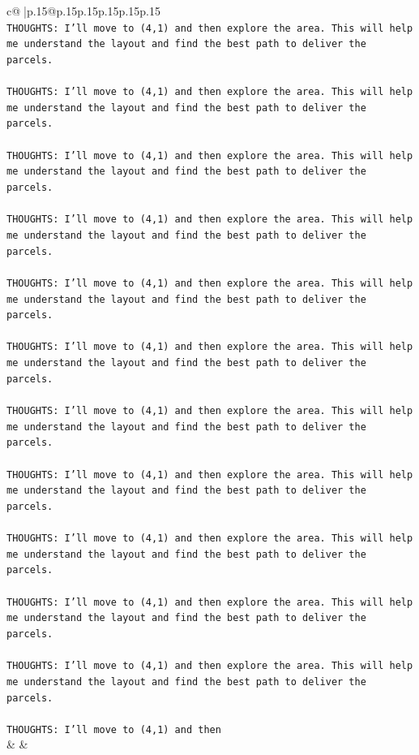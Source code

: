 \documentclass{article}
\begin{document}
{\begin{supertabular}{c@{$\;$}|p{.15\linewidth}@{}p{.15\linewidth}p{.15\linewidth}p{.15\linewidth}p{.15\linewidth}p{.15\linewidth}}
{{{\\ 
\texttt{THOUGHTS: I'll move to (4,1) and then explore the area. This will help me understand the layout and find the best path to deliver the parcels.} \\
\\ 
\texttt{THOUGHTS: I'll move to (4,1) and then explore the area. This will help me understand the layout and find the best path to deliver the parcels.} \\
\\ 
\texttt{THOUGHTS: I'll move to (4,1) and then explore the area. This will help me understand the layout and find the best path to deliver the parcels.} \\
\\ 
\texttt{THOUGHTS: I'll move to (4,1) and then explore the area. This will help me understand the layout and find the best path to deliver the parcels.} \\
\\ 
\texttt{THOUGHTS: I'll move to (4,1) and then explore the area. This will help me understand the layout and find the best path to deliver the parcels.} \\
\\ 
\texttt{THOUGHTS: I'll move to (4,1) and then explore the area. This will help me understand the layout and find the best path to deliver the parcels.} \\
\\ 
\texttt{THOUGHTS: I'll move to (4,1) and then explore the area. This will help me understand the layout and find the best path to deliver the parcels.} \\
\\ 
\texttt{THOUGHTS: I'll move to (4,1) and then explore the area. This will help me understand the layout and find the best path to deliver the parcels.} \\
\\ 
\texttt{THOUGHTS: I'll move to (4,1) and then explore the area. This will help me understand the layout and find the best path to deliver the parcels.} \\
\\ 
\texttt{THOUGHTS: I'll move to (4,1) and then explore the area. This will help me understand the layout and find the best path to deliver the parcels.} \\
\\ 
\texttt{THOUGHTS: I'll move to (4,1) and then explore the area. This will help me understand the layout and find the best path to deliver the parcels.} \\
\\ 
\texttt{THOUGHTS: I'll move to (4,1) and then} \\
            }
        }
    }
    & & \\ \\


\end{supertabular}}
\end{document}

